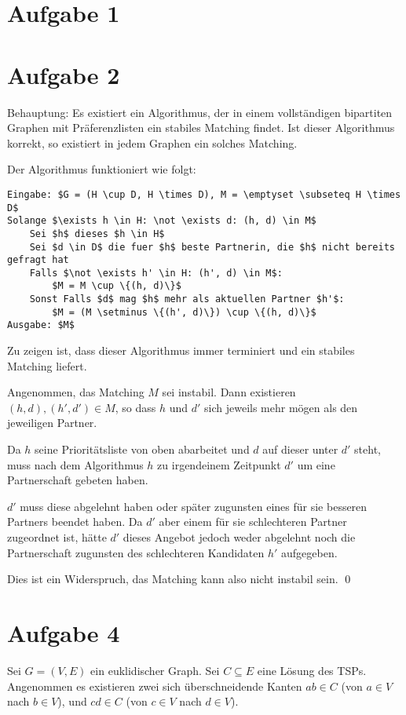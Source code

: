 \documentclass[a4paper]{article}
\begin{document}
\section{Aufgabe 1}

\section{Aufgabe 2}
Behauptung: Es existiert ein Algorithmus, der in einem vollständigen
bipartiten Graphen mit Präferenzlisten ein stabiles Matching findet.
Ist dieser Algorithmus korrekt, so existiert in jedem Graphen ein solches
Matching.

Der Algorithmus funktioniert wie folgt:

\begin{lstlisting}
Eingabe: $G = (H \cup D, H \times D), M = \emptyset \subseteq H \times D$
Solange $\exists h \in H: \not \exists d: (h, d) \in M$
	Sei $h$ dieses $h \in H$
	Sei $d \in D$ die fuer $h$ beste Partnerin, die $h$ nicht bereits gefragt hat
	Falls $\not \exists h' \in H: (h', d) \in M$:
		$M = M \cup \{(h, d)\}$
	Sonst Falls $d$ mag $h$ mehr als aktuellen Partner $h'$:
		$M = (M \setminus \{(h', d)\}) \cup \{(h, d)\}$
Ausgabe: $M$
\end{lstlisting}

Zu zeigen ist, dass dieser Algorithmus immer terminiert und ein stabiles Matching liefert.

Angenommen, das Matching $M$ sei instabil. Dann existieren $(h, d), (h', d') \in M$, 
so dass $h$ und $d'$ sich jeweils mehr mögen als den jeweiligen Partner.

Da $h$ seine Prioritätsliste von oben abarbeitet und $d$ auf dieser unter
$d'$ steht, muss nach dem Algorithmus $h$ zu irgendeinem Zeitpunkt $d'$ um 
eine Partnerschaft gebeten haben.

$d'$ muss diese abgelehnt haben oder später zugunsten eines für sie besseren
Partners beendet haben. Da $d'$ aber einem für sie schlechteren Partner
zugeordnet ist, hätte $d'$ dieses Angebot jedoch weder abgelehnt noch die
Partnerschaft zugunsten des schlechteren Kandidaten $h'$ aufgegeben.

Dies ist ein Widerspruch, das Matching kann also nicht instabil sein. \qed


\section{Aufgabe 4}
	Sei $G=(V,E)$ ein euklidischer Graph.
	Sei $C \subseteq E$ eine Lösung des TSPs.
	Angenommen es existieren zwei sich überschneidende Kanten $ab \in C$ (von $a \in V$ nach $b \in V$), und $cd \in C$ (von $c \in V$ nach $d \in V$). 
	
\end{document}
